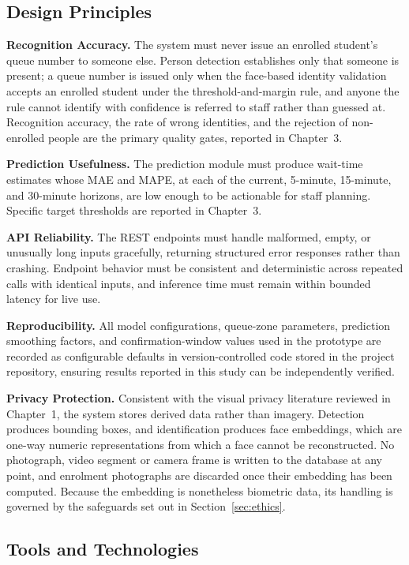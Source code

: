 \documentclass{research}
\begin{document}
\subsection{Design Principles}

\textbf{Recognition Accuracy.} The system must never issue an enrolled
student's queue number to someone else. Person detection establishes
only that someone is present; a queue number is issued only when the
face-based identity validation accepts an enrolled student under the
threshold-and-margin rule, and anyone the rule cannot identify with
confidence is referred to staff rather than guessed at. Recognition
accuracy, the rate of wrong identities, and the rejection of
non-enrolled people are the primary quality gates, reported in
Chapter~3.

\textbf{Prediction Usefulness.} The prediction module must produce
wait-time estimates whose MAE and MAPE, at each of the current,
5-minute, 15-minute, and 30-minute horizons, are low enough to be
actionable for staff planning. Specific target thresholds are reported
in Chapter~3.

\textbf{API Reliability.} The REST endpoints must handle malformed,
empty, or unusually long inputs gracefully, returning structured error
responses rather than crashing. Endpoint behavior must be consistent
and deterministic across repeated calls with identical inputs, and
inference time must remain within bounded latency for live use.

\textbf{Reproducibility.} All model configurations, queue-zone
parameters, prediction smoothing factors, and confirmation-window
values used in the prototype are recorded as configurable defaults in
version-controlled code stored in the project repository, ensuring
results reported in this study can be independently verified.

\textbf{Privacy Protection.} Consistent with the visual privacy
literature reviewed in Chapter~1, the system stores derived data rather
than imagery. Detection produces bounding boxes, and identification
produces face embeddings, which are one-way numeric representations from
which a face cannot be reconstructed. No photograph, video segment or
camera frame is written to the database at any point, and enrolment
photographs are discarded once their embedding has been computed. Because
the embedding is nonetheless biometric data, its handling is governed by
the safeguards set out in Section~\ref{sec:ethics}.

\subsection{Tools and Technologies}
\end{document}
